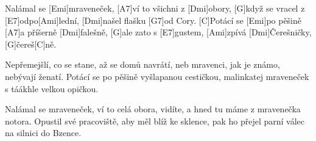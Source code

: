 
\sloka
[C]Nalámal se [Emi]mraveneček, [A7]ví to všichni z [Dmi]obory,
[G]když se vracel z [E7]odpo[Ami]lední, [Dmi]našel flašku [G7]od Cory.
[C]Potácí se [Emi]po pěšině [A7]a příšerně [Dmi]falešně,
[G]ale zato s [E7]gustem, [Ami]zpívá [Dmi]Čerešničky, [G]čereš[C]ně.

\sloka
Nepřemejšlí, co se stane, až se domů navrátí,
neb mravenci, jak je známo, nebývají ženatí.
Potácí se po pěšině vyšlapanou cestičkou,
malinkatej mraveneček s táákhle velkou opičkou.

\sloka
Nalámal se mraveneček, ví to celá obora,
vidíte, a hned tu máme z mravenečka notora.
Opustil své pracoviště, aby měl blíž ke sklence,
pak ho přejel parní válec na silnici do Bzence.
